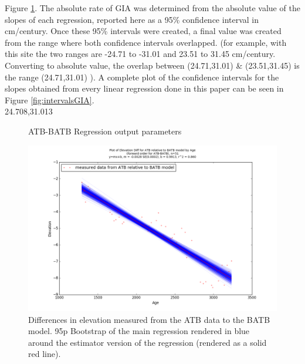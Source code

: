  Figure \ref{fig:ATBxBATB_regression}. The absolute rate of GIA was determined from the
 absolute value of the slopes of each regression, reported here as a 95\% confidence interval
 in cm/century. Once these 95\% intervals were created, a final value was created
 from the range where both confidence intervals overlapped. (for example, with this
 site the two ranges are -24.71 to -31.01 and 23.51 to 31.45 cm/century. Converting
 to absolute value, the overlap between (24.71,31.01) \& (23.51,31.45) is the range
 (24.71,31.01) ). A complete plot of the confidence intervals
 for the slopes obtained from every linear regression done in this paper can be seen in Figure \ref{fig:intervalsGIA}. \\
24.708,31.013

\begin{figure}[H]
	\begin{flushleft}
	\end{flushleft}
	\caption{ATB-BATB Regression output parameters}
	\label{fig:ATBxBATB_regression}
\end{figure}

\newpage

\begin{figure}[H]
	\includegraphics[width=1.7\linewidth, angle=270 ]{data/bothNonZero/withinSeventyFivePercent/gias/theGIA_ATB_relative_to_BATB.png}
	\caption{Differences in elevation measured from the ATB data to the BATB model. 95p Bootstrap of the main regression rendered in blue around the estimator version of the regression (rendered as a solid red line).}
	\label{fig:gias_ATBxBATB}
\end{figure}


